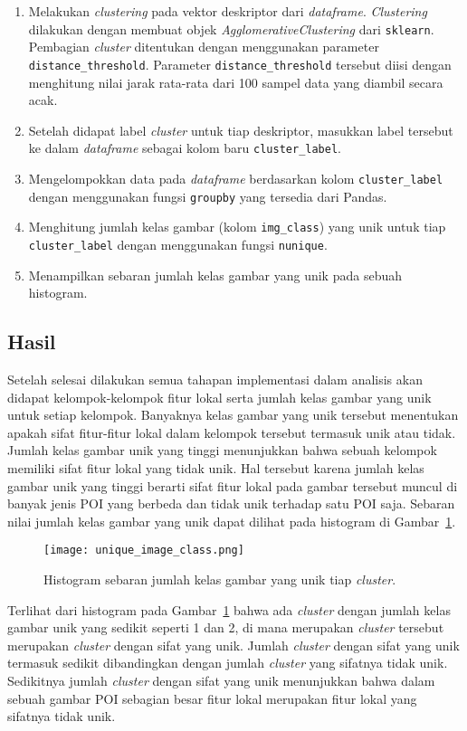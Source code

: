 \begin{enumerate}
	\item Melakukan \textit{clustering} pada vektor deskriptor dari \textit{dataframe}. \textit{Clustering} dilakukan dengan membuat objek \textit{AgglomerativeClustering} dari \texttt{sklearn}. Pembagian \textit{cluster} ditentukan dengan menggunakan parameter \texttt{distance\_threshold}. Parameter \texttt{distance\_threshold} tersebut diisi dengan menghitung nilai jarak rata-rata dari 100 sampel data yang diambil secara acak.
	\item Setelah didapat label \textit{cluster} untuk tiap deskriptor, masukkan label tersebut ke dalam \textit{dataframe} sebagai kolom baru \texttt{cluster\_label}.
	\item Mengelompokkan data pada \textit{dataframe} berdasarkan kolom \texttt{cluster\_label} dengan menggunakan fungsi \texttt{groupby} yang tersedia dari Pandas. 
	\item Menghitung jumlah kelas gambar (kolom \texttt{img\_class}) yang unik untuk tiap \texttt{cluster\_label} dengan menggunakan fungsi \texttt{nunique}.
	\item Menampilkan sebaran jumlah kelas gambar yang unik pada sebuah histogram.
\end{enumerate}

\subsection{Hasil}
Setelah selesai dilakukan semua tahapan implementasi dalam analisis akan didapat kelompok-kelompok fitur lokal serta jumlah kelas gambar yang unik untuk setiap kelompok. Banyaknya kelas gambar yang unik tersebut menentukan apakah sifat fitur-fitur lokal dalam kelompok tersebut termasuk unik atau tidak. Jumlah kelas gambar unik yang tinggi menunjukkan bahwa sebuah kelompok memiliki sifat fitur lokal yang tidak unik. Hal tersebut karena jumlah kelas gambar unik yang tinggi berarti sifat fitur lokal pada gambar tersebut muncul di banyak jenis POI yang berbeda dan tidak unik terhadap satu POI saja. Sebaran nilai jumlah kelas gambar yang unik dapat dilihat pada histogram di Gambar~\ref{fig:unique_image_class}.
\begin{figure}[H]
	\centering
	\texttt{[image: unique\_image\_class.png]}
	\caption{Histogram sebaran jumlah kelas gambar yang unik tiap \textit{cluster}.}
	\label{fig:unique_image_class}
\end{figure}
Terlihat dari histogram pada Gambar~\ref{fig:unique_image_class} bahwa ada \textit{cluster} dengan jumlah kelas gambar unik yang sedikit seperti 1 dan 2, di mana merupakan \textit{cluster} tersebut merupakan \textit{cluster} dengan sifat yang unik. Jumlah \textit{cluster} dengan sifat yang unik termasuk sedikit dibandingkan dengan jumlah \textit{cluster} yang sifatnya tidak unik. Sedikitnya jumlah \textit{cluster} dengan sifat yang unik menunjukkan bahwa dalam sebuah gambar POI sebagian besar fitur lokal merupakan fitur lokal yang sifatnya tidak unik.

